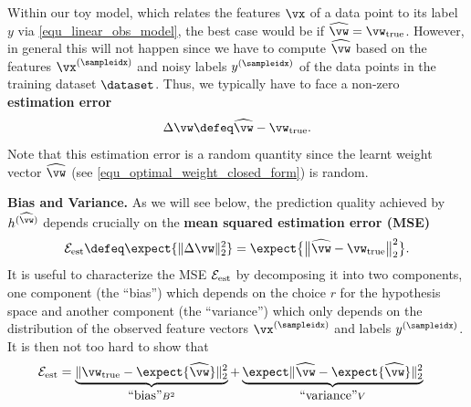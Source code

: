 \documentclass[12pt]{report}
\begin{document}
Within our toy model, which relates the features $\vx$ of a data point to its label $y$ via \eqref{equ_linear_obs_model}, 
the best case would be if $\widehat{\vw} = \vw_{\rm true}$. However, in general this will not happen since we have to 
compute $\widehat{\vw}$ based on the features $\vx^{(\sampleidx)}$ and noisy labels $y^{(\sampleidx)}$ of the data 
points in the training dataset $\dataset$. Thus, we typically have to face a non-zero {\bf estimation error}
\begin{equation}
\label{equ_def_est_error}
\Delta \vw \defeq \widehat{\vw} - \vw_{\rm true}. 
\end{equation} 
Note that this estimation error is a random quantity since the learnt weight vector $\widehat{\vw}$ 
(see \eqref{equ_optimal_weight_closed_form}) is random.

{\bf Bias and Variance.} 
As we will see below, the prediction quality achieved by $h^{(\widehat{\vw})}$ depends crucially on the 
{\bf mean squared estimation error (MSE)}
\begin{equation}
\label{equ_def_est_err}
\mathcal{E}_{\rm est} \defeq \expect \{  \| \Delta \vw \|^{2}_{2} \} =  \expect \big\{ \big \| \widehat{\vw} - \vw_{\rm true} \big\|^{2}_{2} \big \}. 
\end{equation}
It is useful to characterize the MSE $\mathcal{E}_{\rm est}$ by 
decomposing it into two components, one component (the ``bias'') 
which depends on the choice $r$ for the hypothesis space and 
another component (the ``variance'') which only depends on the 
distribution of the observed feature vectors $\vx^{(\sampleidx)}$ 
and labels $y^{(\sampleidx)}$. It is then not too hard to show that 
\vspace*{-1mm}
\begin{align}
\label{equ_bias_var_decomp}
\mathcal{E}_{\rm est} & = \underbrace{ \| \vw_{\rm true} - \expect \{ \widehat{\vw} \} \|^{2}_{2} }_{\mbox{``bias''} B^2}+ \underbrace{\expect \| \widehat{\vw} - \expect \{ \widehat{\vw} \} \|^{2}_{2}}_{\mbox{``variance''} V} 
\end{align} 
\end{document}
